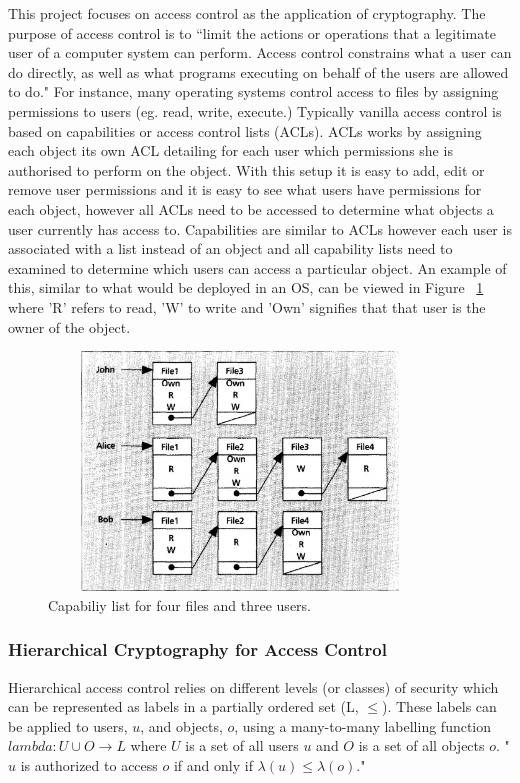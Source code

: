 \documentclass[12pt, titlepage]{article}
\begin{document}
\newline \indent This project focuses on access control as the application of cryptography. The purpose of access control is to ``limit the actions or operations that a legitimate user of a computer system can perform. Access control constrains what a user can do directly, as well as what programs executing on behalf of the users are allowed to do."\cite{accessControlPrinciples} For instance, many operating systems control access to files by assigning permissions to users (eg. read, write, execute.) Typically vanilla access control is based on capabilities or access control lists (ACLs). ACLs works by assigning each object its own ACL detailing for each user which permissions she is authorised to perform on the object. With this setup it is easy to add, edit or remove user permissions and it is easy to see what users have permissions for each object, however all ACLs need to be accessed to determine what objects a user currently has access to. Capabilities are similar to ACLs however each user is associated with a list instead of an object and all capability lists need to examined to determine which users can access a particular object. An example of this, similar to what would be deployed in an OS, can be viewed in Figure ~\ref{fig:capabilities} where 'R' refers to read, 'W' to write and 'Own' signifies that that user is the owner of the object.

\begin{figure}
\centerline{\includegraphics[height=2.5in,width=4in,angle=0]{capabilities.pdf}}
\caption{Capabiliy list for four files and three users.\cite{accessControlPrinciples}}
\label{fig:capabilities}
\end{figure}

\subsubsection{Hierarchical Cryptography for Access Control}
Hierarchical access control relies on different levels (or classes) of security which can be represented as labels in a partially ordered set (L, $≤$). These labels can be applied to users, $u$, and objects, $o$, using a many-to-many labelling function $lambda : U ∪ O → L$ where $U$ is a set of all users $u$ and $O$ is a set of all objects $o$. "$u$ is authorized to access $o$ if and only if $\lambda(u)≤\lambda(o)$\cite{mainPaper}."
\end{document}
